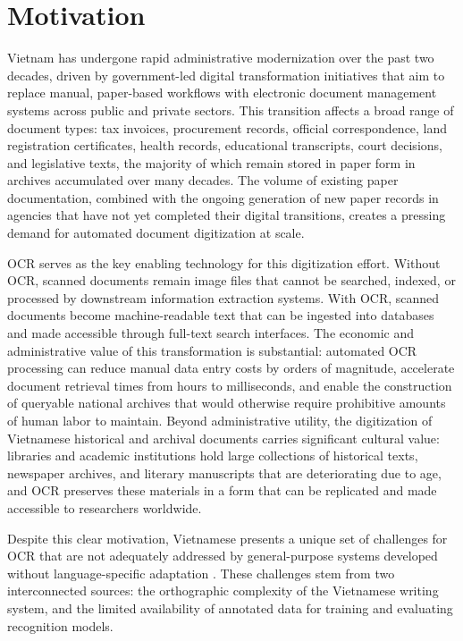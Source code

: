 \section{Motivation}

Vietnam has undergone rapid administrative modernization over the past two decades, driven by government-led digital transformation initiatives that aim to replace manual, paper-based workflows with electronic document management systems across public and private sectors. This transition affects a broad range of document types: tax invoices, procurement records, official correspondence, land registration certificates, health records, educational transcripts, court decisions, and legislative texts, the majority of which remain stored in paper form in archives accumulated over many decades. The volume of existing paper documentation, combined with the ongoing generation of new paper records in agencies that have not yet completed their digital transitions, creates a pressing demand for automated document digitization at scale.

OCR serves as the key enabling technology for this digitization effort. Without OCR, scanned documents remain image files that cannot be searched, indexed, or processed by downstream information extraction systems. With OCR, scanned documents become machine-readable text that can be ingested into databases and made accessible through full-text search interfaces. The economic and administrative value of this transformation is substantial: automated OCR processing can reduce manual data entry costs by orders of magnitude, accelerate document retrieval times from hours to milliseconds, and enable the construction of queryable national archives that would otherwise require prohibitive amounts of human labor to maintain. Beyond administrative utility, the digitization of Vietnamese historical and archival documents carries significant cultural value: libraries and academic institutions hold large collections of historical texts, newspaper archives, and literary manuscripts that are deteriorating due to age, and OCR preserves these materials in a form that can be replicated and made accessible to researchers worldwide.

Despite this clear motivation, Vietnamese presents a unique set of challenges for OCR that are not adequately addressed by general-purpose systems developed without language-specific adaptation \cite{Le2025}. These challenges stem from two interconnected sources: the orthographic complexity of the Vietnamese writing system, and the limited availability of annotated data for training and evaluating recognition models.

